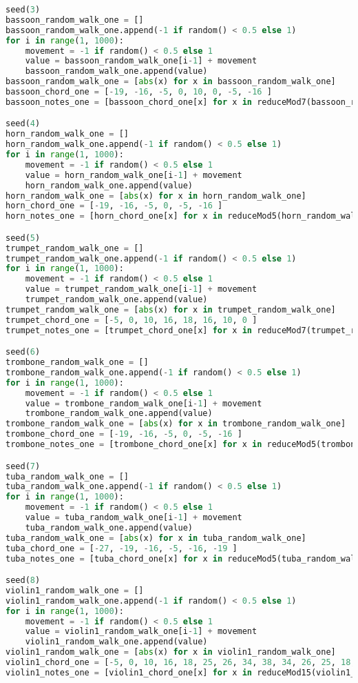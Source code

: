 \begin{lstlisting}[language=Python, caption=Tianshu Segment\_II]
seed(3)
bassoon_random_walk_one = []
bassoon_random_walk_one.append(-1 if random() < 0.5 else 1)
for i in range(1, 1000):
    movement = -1 if random() < 0.5 else 1
    value = bassoon_random_walk_one[i-1] + movement
    bassoon_random_walk_one.append(value)
bassoon_random_walk_one = [abs(x) for x in bassoon_random_walk_one]
bassoon_chord_one = [-19, -16, -5, 0, 10, 0, -5, -16 ]
bassoon_notes_one = [bassoon_chord_one[x] for x in reduceMod7(bassoon_random_walk_one)]

seed(4)
horn_random_walk_one = []
horn_random_walk_one.append(-1 if random() < 0.5 else 1)
for i in range(1, 1000):
    movement = -1 if random() < 0.5 else 1
    value = horn_random_walk_one[i-1] + movement
    horn_random_walk_one.append(value)
horn_random_walk_one = [abs(x) for x in horn_random_walk_one]
horn_chord_one = [-19, -16, -5, 0, -5, -16 ]
horn_notes_one = [horn_chord_one[x] for x in reduceMod5(horn_random_walk_one)]

seed(5)
trumpet_random_walk_one = []
trumpet_random_walk_one.append(-1 if random() < 0.5 else 1)
for i in range(1, 1000):
    movement = -1 if random() < 0.5 else 1
    value = trumpet_random_walk_one[i-1] + movement
    trumpet_random_walk_one.append(value)
trumpet_random_walk_one = [abs(x) for x in trumpet_random_walk_one]
trumpet_chord_one = [-5, 0, 10, 16, 18, 16, 10, 0 ]
trumpet_notes_one = [trumpet_chord_one[x] for x in reduceMod7(trumpet_random_walk_one)]

seed(6)
trombone_random_walk_one = []
trombone_random_walk_one.append(-1 if random() < 0.5 else 1)
for i in range(1, 1000):
    movement = -1 if random() < 0.5 else 1
    value = trombone_random_walk_one[i-1] + movement
    trombone_random_walk_one.append(value)
trombone_random_walk_one = [abs(x) for x in trombone_random_walk_one]
trombone_chord_one = [-19, -16, -5, 0, -5, -16 ]
trombone_notes_one = [trombone_chord_one[x] for x in reduceMod5(trombone_random_walk_one)]

seed(7)
tuba_random_walk_one = []
tuba_random_walk_one.append(-1 if random() < 0.5 else 1)
for i in range(1, 1000):
    movement = -1 if random() < 0.5 else 1
    value = tuba_random_walk_one[i-1] + movement
    tuba_random_walk_one.append(value)
tuba_random_walk_one = [abs(x) for x in tuba_random_walk_one]
tuba_chord_one = [-27, -19, -16, -5, -16, -19 ]
tuba_notes_one = [tuba_chord_one[x] for x in reduceMod5(tuba_random_walk_one)]

seed(8)
violin1_random_walk_one = []
violin1_random_walk_one.append(-1 if random() < 0.5 else 1)
for i in range(1, 1000):
    movement = -1 if random() < 0.5 else 1
    value = violin1_random_walk_one[i-1] + movement
    violin1_random_walk_one.append(value)
violin1_random_walk_one = [abs(x) for x in violin1_random_walk_one]
violin1_chord_one = [-5, 0, 10, 16, 18, 25, 26, 34, 38, 34, 26, 25, 18, 16, 10, 0 ]
violin1_notes_one = [violin1_chord_one[x] for x in reduceMod15(violin1_random_walk_one)]


\end{lstlisting}
